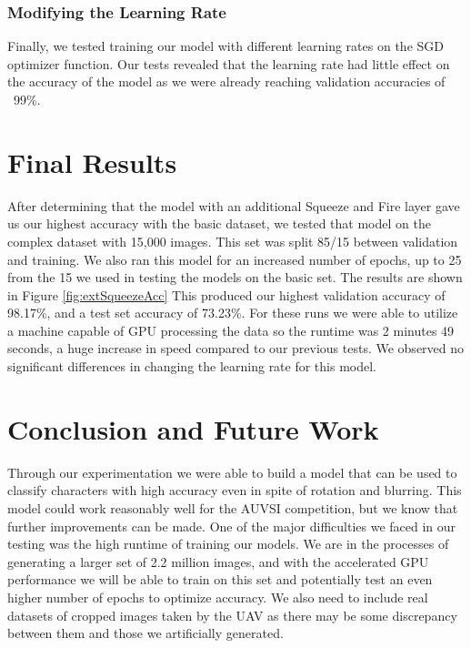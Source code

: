\documentclass{article}
\begin{document}
\subsubsection{Modifying the Learning Rate}

Finally, we tested training our model with different learning rates on the SGD optimizer function. 
Our tests revealed that the learning rate had little effect on the accuracy of the model as we were 
already reaching validation accuracies of ~99\%.

\section{Final Results}

After determining that the model with an additional Squeeze and Fire layer gave us our highest accuracy 
with the basic dataset, we tested that model on the complex dataset with 15,000 images. This set was 
split 85/15 between validation and training. We also ran this model for an increased number of epochs, 
up to 25 from the 15 we used in testing the models on the basic set. The results are shown in Figure \ref{fig:extSqueezeAcc} 
This produced our highest validation accuracy of 98.17\%, and a test set accuracy of 73.23\%. For these runs 
we were able to utilize a machine capable of GPU processing the data so the runtime was 2 minutes 49 
seconds, a huge increase in speed compared to our previous tests. We observed no significant differences 
in changing the learning rate for this model.

\section{Conclusion and Future Work}

Through our experimentation we were able to build a model that can be used to classify characters 
with high accuracy even in spite of rotation and blurring. This model could work reasonably well 
for the AUVSI competition, but we know that further improvements can be made. One of the major 
difficulties we faced in our testing was the high runtime of training our models. We are in the 
processes of generating a larger set of 2.2 million images, and with the accelerated GPU performance 
we will be able to train on this set and potentially test an even higher number of epochs to optimize 
accuracy. We also need to include real datasets of cropped images taken by the UAV as there may be 
some discrepancy between them and those we artificially generated.  
\end{document}
